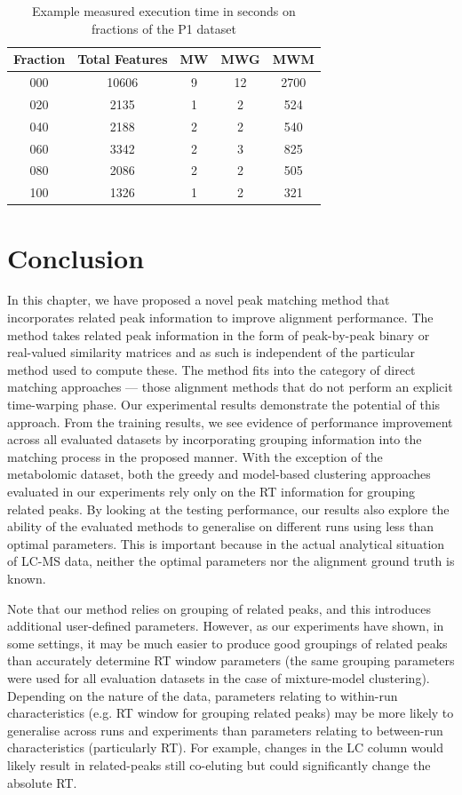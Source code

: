 \begin{table}[!htbp]
\noindent \begin{centering}
\begin{tabular}{|c|c|c|c|c|}
\hline 
\textbf{Fraction} & \textbf{Total Features} & \textbf{MW} & \textbf{MWG} & \textbf{MWM}\tabularnewline
\hline 
\hline 
000 & 10606 & 9 & 12 & 2700\tabularnewline
\hline 
020 & 2135 & 1 & 2 & 524\tabularnewline
\hline 
040 & 2188 & 2 & 2 & 540\tabularnewline
\hline 
060 & 3342 & 2 & 3 & 825\tabularnewline
\hline 
080 & 2086 & 2 & 2 & 505\tabularnewline
\hline 
100 & 1326 & 1 & 2 & 321\tabularnewline
\hline 
\end{tabular}
\par\end{centering}
\caption{\label{tab:Running-Time-P1}Example measured execution time in seconds on fractions of the P1 dataset}
\end{table}

\section{Conclusion}

\label{sec:conc}
In this chapter, we have proposed a novel peak matching method that incorporates related peak information to improve alignment performance. The method takes related peak information in the form of peak-by-peak binary or real-valued similarity matrices and as such is independent of the particular method used to compute these. The method fits into the category of direct matching approaches --- those alignment methods that do not perform an explicit time-warping phase. Our experimental results demonstrate the potential of this approach. From the training results, we see evidence of performance improvement across all evaluated datasets by incorporating grouping information into the matching process in the proposed manner. With the exception of the metabolomic dataset, both the greedy and model-based clustering approaches evaluated in our experiments rely only on the \ac{RT} information for grouping related peaks. By looking at the testing performance, our results also explore the ability of the evaluated methods to generalise on different runs using less than optimal parameters. This is important because in the actual analytical situation of LC-MS data, neither the optimal parameters nor the alignment ground truth is known. 

Note that our method relies on grouping of related peaks, and this introduces additional user-defined parameters. However, as our experiments have shown, in some settings, it may be much easier to produce good groupings of related peaks than accurately determine \ac{RT} window parameters (the same grouping parameters were used for all evaluation datasets in the case of mixture-model clustering). Depending on the nature of the data, parameters relating to within-run characteristics (e.g. \ac{RT} window for grouping related peaks) may be more likely to generalise across runs and experiments than parameters relating to between-run characteristics (particularly \ac{RT}). For example, changes in the \ac{LC} column would likely result in related-peaks still co-eluting but could significantly change the absolute \ac{RT}. 

